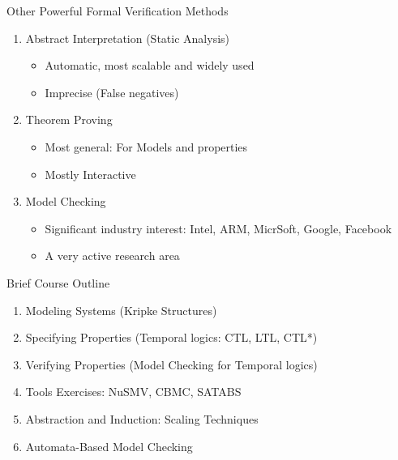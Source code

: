 \documentclass{beamer}
\begin{document}
\begin{frame}{Other Powerful Formal Verification Methods}
\begin{enumerate}
\item<1-> Abstract Interpretation (Static Analysis)
\begin{itemize}
\item Automatic, most scalable and widely used

\item Imprecise (False negatives)
\end{itemize}
\item<2-> Theorem Proving
\begin{itemize}
\item Most general: For Models and properties

\item Mostly Interactive
\end{itemize}

\item<3-> Model Checking
\begin{itemize}
\item Significant industry interest: Intel, ARM, MicrSoft, Google, Facebook
\item A very active research area
\end{itemize}
\end{enumerate}
\end{frame}

\begin{frame}{Brief Course Outline}
\begin{enumerate}
\item Modeling Systems (Kripke Structures)
\item Specifying Properties (Temporal logics: CTL, LTL, CTL*)
\item Verifying Properties (Model Checking for Temporal logics)
\item Tools Exercises: NuSMV, CBMC, SATABS
\item Abstraction and Induction: Scaling Techniques
\item Automata-Based Model Checking
\end{enumerate}
\end{frame}
\end{document}
